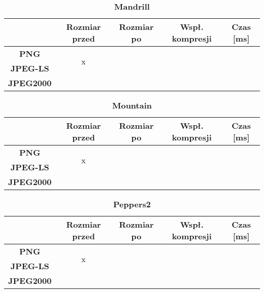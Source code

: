 \begin{table}[!h]
	\centering
	\caption{\textbf{Mandrill}}
	\label{my-label}
	\begin{tabular}{|c|c|c|c|c|}                                             
		\hline
		& \textbf{Rozmiar przed} & \textbf{Rozmiar po} & \textbf{Wspł. kompresji} & \textbf{Czas {[}ms{]}} \\ \hline 
		\textbf{PNG}      &          \multicolumn{1}{c|}{\multirow{2}{*}{x}}             &                     &                          &                             \\\cline{3-5}
		\textbf{JPEG-LS}  &                        &                     &                          &                          \\\cline{3-5}
		\textbf{JPEG2000} &                        &                     &                          &                      \\ \hline
	\end{tabular}
\end{table}

\begin{table}[!h]
	\centering
	\caption{\textbf{Mountain}}
	\label{my-label}
	\begin{tabular}{|c|c|c|c|c|}                                             
		\hline
		& \textbf{Rozmiar przed} & \textbf{Rozmiar po} & \textbf{Wspł. kompresji} & \textbf{Czas {[}ms{]}} \\ \hline 
		\textbf{PNG}      &          \multicolumn{1}{c|}{\multirow{2}{*}{x}}             &                     &                          &                             \\\cline{3-5}
		\textbf{JPEG-LS}  &                        &                     &                          &                          \\\cline{3-5}
		\textbf{JPEG2000} &                        &                     &                          &                      \\ \hline
	\end{tabular}
\end{table}

\begin{table}[!h]
	\centering
	\caption{\textbf{Peppers2}}
	\label{my-label}
	\begin{tabular}{|c|c|c|c|c|}                                             
		\hline
		& \textbf{Rozmiar przed} & \textbf{Rozmiar po} & \textbf{Wspł. kompresji} & \textbf{Czas {[}ms{]}} \\ \hline 
		\textbf{PNG}      &          \multicolumn{1}{c|}{\multirow{2}{*}{x}}             &                     &                          &                             \\\cline{3-5}
		\textbf{JPEG-LS}  &                        &                     &                          &                          \\\cline{3-5}
		\textbf{JPEG2000} &                        &                     &                          &                      \\ \hline
	\end{tabular}
\end{table}

